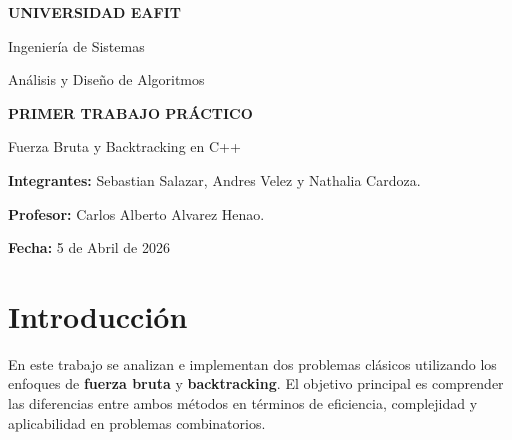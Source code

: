 \documentclass[12pt]{article}
\begin{document}

\begin{titlepage}

\centering

\vspace*{2cm}

{\Large \textbf{UNIVERSIDAD EAFIT}}

\vspace{0.5cm}

{\large Ingeniería de Sistemas}

\vspace{0.5cm}

{\large Análisis y Diseño de Algoritmos}

\vspace{2cm}

{\Huge \textbf{PRIMER TRABAJO PRÁCTICO}}

\vspace{0.5cm}

{\Large Fuerza Bruta y Backtracking en C++}

\vspace{3cm}

\begin{flushleft}

\textbf{Integrantes:} Sebastian Salazar, Andres Velez y Nathalia Cardoza. \\

\vspace{0.3cm}

\textbf{Profesor:} Carlos Alberto Alvarez Henao. \\

\vspace{0.3cm}

\textbf{Fecha:} 5 de Abril de 2026 \\

\end{flushleft}

\vfill

\end{titlepage}

\tableofcontents

\newpage


\section{Introducción}

En este trabajo se analizan e implementan dos problemas clásicos utilizando los enfoques de \textbf{fuerza bruta} y \textbf{backtracking}. El objetivo principal es comprender las diferencias entre ambos métodos en términos de eficiencia, complejidad y aplicabilidad en problemas combinatorios.
\end{document}
